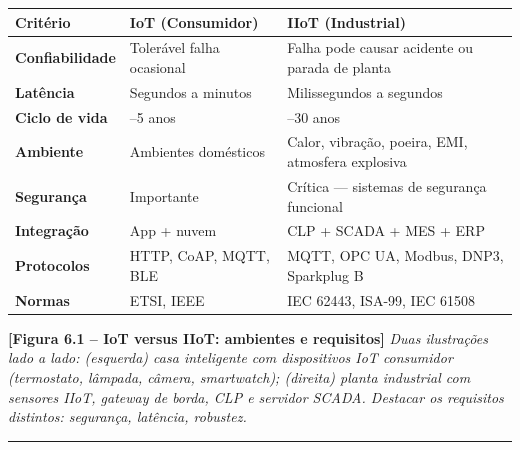\begin{longtable}[]{@{}
  >{\raggedright\arraybackslash}p{}
  >{\raggedright\arraybackslash}p{}
  >{\raggedright\arraybackslash}p{}@{}}
\toprule\noalign{}
\begin{minipage}[b]{\linewidth}\raggedright
Critério
\end{minipage} & \begin{minipage}[b]{\linewidth}\raggedright
IoT (Consumidor)
\end{minipage} & \begin{minipage}[b]{\linewidth}\raggedright
IIoT (Industrial)
\end{minipage} \\
\midrule\noalign{}
\endhead
\bottomrule\noalign{}
\endlastfoot
\textbf{Confiabilidade} & Tolerável falha ocasional & Falha pode causar acidente ou parada de planta \\
\textbf{Latência} & Segundos a minutos & Milissegundos a segundos \\
\textbf{Ciclo de vida} & 3--5 anos & 15--30 anos \\
\textbf{Ambiente} & Ambientes domésticos & Calor, vibração, poeira, EMI, atmosfera explosiva \\
\textbf{Segurança} & Importante & Crítica --- sistemas de segurança funcional \\
\textbf{Integração} & App + nuvem & CLP + SCADA + MES + ERP \\
\textbf{Protocolos} & HTTP, CoAP, MQTT, BLE & MQTT, OPC UA, Modbus, DNP3, Sparkplug B \\
\textbf{Normas} & ETSI, IEEE & IEC 62443, ISA-99, IEC 61508 \\
\end{longtable}

\begin{caixafigura}

\textbf{{[}Figura 6.1 -- IoT versus IIoT: ambientes e requisitos{]}}
\emph{Duas ilustrações lado a lado: (esquerda) casa inteligente com dispositivos IoT consumidor (termostato, lâmpada, câmera, smartwatch); (direita) planta industrial com sensores IIoT, gateway de borda, CLP e servidor SCADA. Destacar os requisitos distintos: segurança, latência, robustez.}

\end{caixafigura}

\begin{center}\rule{0.5\linewidth}{0.5pt}\end{center}

